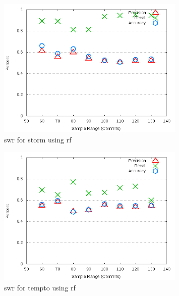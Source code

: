\begin{figure}[!t]
\centering
\includegraphics[width=0.8\textwidth]{images/rf/test_1/storm_sample_range.png}
\caption{\gls{swr} for storm using \gls{rf}}
\label{fig:test_1_storm_rf}
\end{figure}

\clearpage
\begin{figure}[!t]
\centering
\includegraphics[width=0.8\textwidth]{images/rf/test_1/tempto_sample_range.png}
\caption{\gls{swr} for tempto using \gls{rf}}
\label{fig:test_1_tempto_rf}
\end{figure}

